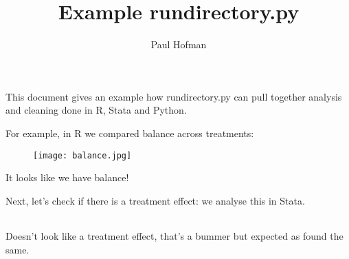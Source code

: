 \documentclass[11pt, a4paper]{article}
\title{Example rundirectory.py}
\author{Paul Hofman}
\begin{document}
\maketitle

This document gives an example how rundirectory.py can pull together analysis and cleaning done in R, Stata and Python.

For example, in R we compared balance across treatments:

\begin{figure}[!htbp]\centering 
	\texttt{[image: balance.jpg]}
\end{figure}

It looks like we have balance! 

Next, let's check if there is  a treatment effect: we analyse this in Stata.

\begin{table}[!htbp]\centering
    \begin{tabular}{l*{2}{r}}
    	\hline\hline
    	
    	\hline\hline
  	\end{tabular}
\end{table}	

Doesn't look like a treatment effect, that's a bummer but expected as  found the same.



\end{document}
